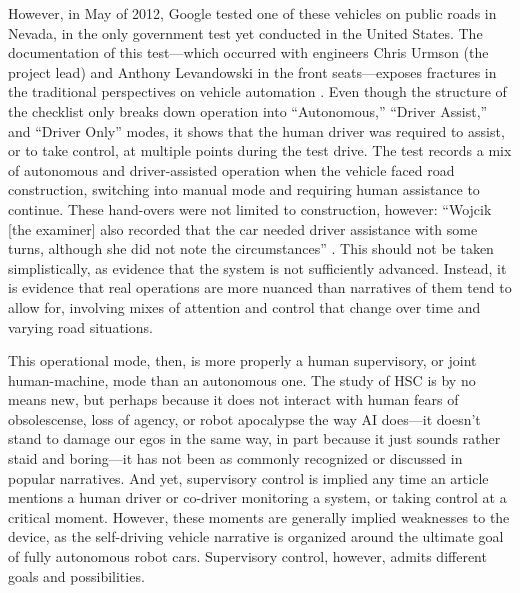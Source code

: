 
However, in May of 2012,
Google tested one of these vehicles on public
roads in Nevada, in the only government test yet conducted in the United States.
The documentation of this test---which occurred with engineers Chris
Urmson (the project lead) and Anthony Levandowski in the front
seats---exposes fractures in the traditional perspectives on vehicle
automation \cite{harrisNevada}. Even though the structure of the
checklist only breaks down operation into ``Autonomous,'' ``Driver
Assist,'' and ``Driver Only'' modes, it shows that the human driver
was required to assist, or to take control, at multiple points during
the test drive. The test records a mix of autonomous and
driver-assisted operation when the vehicle faced road construction,
switching into manual mode and requiring human assistance to continue.
These hand-overs were not limited to construction, however: 
``Wojcik [the examiner] also recorded that the car needed driver
assistance with some turns, although she did not note the
circumstances'' \cite{harrisNevada}. This should not be taken
simplistically, as evidence that the system is not sufficiently
advanced. Instead, it is evidence that real operations are more
nuanced than narratives of them tend to allow for, involving mixes of
attention and control that change over time and varying road situations.

This operational mode, then, is more properly a human supervisory, or
joint human-machine, mode
than an autonomous one. The study of HSC is by no means new, but
perhaps because it does not interact with human fears of obsolescense,
loss of agency, or robot apocalypse the way AI does---it doesn't stand
to damage our egos in the same way, in part because it just
sounds rather staid and boring---it has not been as commonly
recognized or discussed in popular narratives. And yet, supervisory
control is implied any time an article mentions a human driver or
co-driver monitoring a system, or taking control at a critical moment.
However, these moments are generally implied weaknesses to the device,
as the self-driving vehicle narrative is organized around the ultimate
goal of fully autonomous robot cars. Supervisory control, however,
admits different goals and possibilities.


